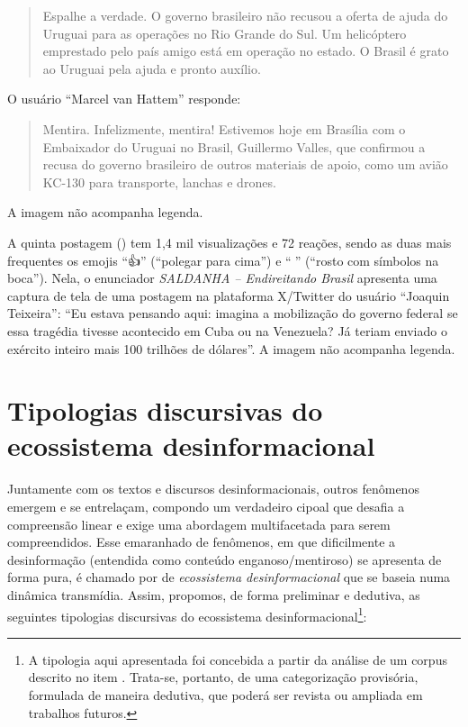 \documentclass[portuguese]{textolivre}
\begin{document}
\begin{quote}
    Espalhe a verdade. O governo brasileiro não recusou a oferta de ajuda do Uruguai para as operações no Rio Grande do Sul. Um helicóptero emprestado pelo país amigo está em operação no estado. O Brasil é grato ao Uruguai pela ajuda e pronto auxílio.
\end{quote}

O usuário ``Marcel van Hattem'' responde:
\begin{quote}
    Mentira. Infelizmente, mentira! Estivemos hoje em Brasília com o Embaixador do Uruguai no Brasil, Guillermo Valles, que confirmou a recusa do governo brasileiro de outros materiais de apoio, como um avião KC-130 para transporte, lanchas e drones.
\end{quote}
A imagem não acompanha legenda.

A quinta postagem () tem 1,4 mil visualizações e 72 reações, sendo as duas mais frequentes os emojis  ``{\Symbola 👍}'' (``polegar para cima'') e ``{\Symbola 🤬}'' (``rosto com símbolos na boca''). Nela, o enunciador \emph{SALDANHA -- Endireitando Brasil} apresenta uma captura de tela de uma postagem na plataforma X/Twitter do usuário ``Joaquin Teixeira'': ``Eu estava pensando aqui: imagina a mobilização do governo federal se essa tragédia tivesse acontecido em Cuba ou na Venezuela? Já teriam enviado o exército inteiro mais 100 trilhões de dólares''. A imagem não acompanha legenda.

\section{Tipologias discursivas do ecossistema desinformacional}\label{sec-tipologias-discur}
Juntamente com os textos e discursos desinformacionais, outros fenômenos emergem e se entrelaçam, compondo um verdadeiro cipoal que desafia a compreensão linear e exige uma abordagem multifacetada para serem compreendidos.  Esse emaranhado de fenômenos, em que dificilmente a desinformação (entendida como conteúdo enganoso/mentiroso) se apresenta de forma pura, é chamado por \textcite{alzamora2021} de \emph{ecossistema desinformacional} que se baseia numa dinâmica transmídia. Assim, propomos, de forma preliminar e dedutiva, as seguintes tipologias discursivas do ecossistema desinformacional\footnote{A tipologia aqui apresentada foi concebida a partir da análise de um corpus descrito no item . Trata-se, portanto, de uma categorização provisória, formulada de maneira dedutiva, que poderá ser revista ou ampliada em trabalhos futuros.}:
\end{document}

